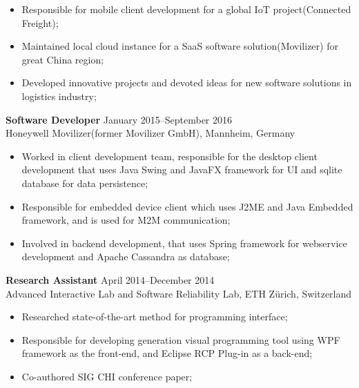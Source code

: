 \documentclass[margin, 10pt]{res} %
\begin{document}
\begin{resume}
\begin{CJK}{UTF8}{gbsn}
\begin{itemize} \itemsep -2pt %
\item Responsible for mobile client development for a global IoT project(Connected Freight);
\item Maintained local cloud instance for a SaaS software solution(Movilizer) for great China region;
\item Developed innovative projects and devoted ideas for new software solutions in logistics industry;
\end{itemize}

\textbf{Software Developer} \hfill January 2015–September 2016 \\
Honeywell Movilizer(former Movilizer GmbH), Mannheim, Germany 

\begin{itemize} \itemsep -2pt %
\item Worked in client development team, responsible for the desktop client development that uses Java Swing and JavaFX framework for UI and sqlite database for data persistence;
\item Responsible for embedded device client which uses J2ME and Java Embedded framework, and is used for M2M communication;
\item Involved in backend development, that uses Spring framework for webservice development and Apache Cassandra as database;
\end{itemize}

\textbf{Research Assistant} \hfill April 2014–December 2014 \\
Advanced Interactive Lab and Software Reliability Lab, ETH Zürich, Switzerland 

\begin{itemize} \itemsep -2pt %
\item Researched state-of-the-art method for programming interface;
\item Responsible for developing generation visual programming tool using WPF framework as the front-end, and Eclipse RCP Plug-in as a back-end;
\item Co-authored SIG CHI conference paper;
\end{itemize}


\end{CJK}
\end{resume}
\end{document}
